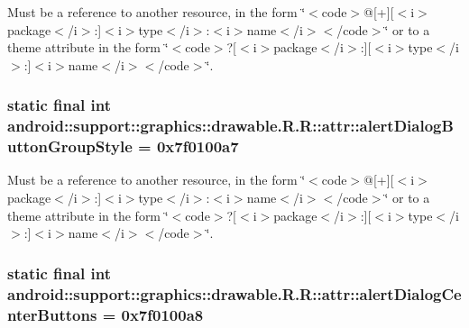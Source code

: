 Must be a reference to another resource, in the form \char`\"{}$<$code$>$@\mbox{[}+\mbox{]}\mbox{[}$<$i$>$package$<$/i$>$:\mbox{]}$<$i$>$type$<$/i$>$:$<$i$>$name$<$/i$>$$<$/code$>$\char`\"{} or to a theme attribute in the form \char`\"{}$<$code$>$?\mbox{[}$<$i$>$package$<$/i$>$:\mbox{]}\mbox{[}$<$i$>$type$<$/i$>$:\mbox{]}$<$i$>$name$<$/i$>$$<$/code$>$\char`\"{}. \hypertarget{classandroid_1_1support_1_1graphics_1_1drawable_1_1_r_1_1attr_66dda8876a91412b5df5e41efc4e8b9b}{
\subsubsection[{alertDialogButtonGroupStyle}]{\setlength{\rightskip}{0pt plus 5cm}static final int android::support::graphics::drawable.R.R::attr::alertDialogButtonGroupStyle = 0x7f0100a7}}
\label{classandroid_1_1support_1_1graphics_1_1drawable_1_1_r_1_1attr_66dda8876a91412b5df5e41efc4e8b9b}


Must be a reference to another resource, in the form \char`\"{}$<$code$>$@\mbox{[}+\mbox{]}\mbox{[}$<$i$>$package$<$/i$>$:\mbox{]}$<$i$>$type$<$/i$>$:$<$i$>$name$<$/i$>$$<$/code$>$\char`\"{} or to a theme attribute in the form \char`\"{}$<$code$>$?\mbox{[}$<$i$>$package$<$/i$>$:\mbox{]}\mbox{[}$<$i$>$type$<$/i$>$:\mbox{]}$<$i$>$name$<$/i$>$$<$/code$>$\char`\"{}. \hypertarget{classandroid_1_1support_1_1graphics_1_1drawable_1_1_r_1_1attr_00f3ccebf2b532f667f33cee934f1206}{
\subsubsection[{alertDialogCenterButtons}]{\setlength{\rightskip}{0pt plus 5cm}static final int android::support::graphics::drawable.R.R::attr::alertDialogCenterButtons = 0x7f0100a8}}
\label{classandroid_1_1support_1_1graphics_1_1drawable_1_1_r_1_1attr_00f3ccebf2b532f667f33cee934f1206}


